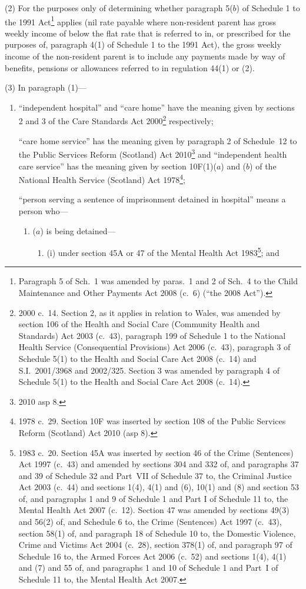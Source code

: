 \documentclass[12pt,a4paper]{article}
\begin{document}
(2) For the purposes only of determining whether paragraph 5($b$)  of Schedule 1 to the 1991 Act\footnote{Paragraph 5 of Sch.~1 was amended by paras.~1 and 2 of Sch.~4 to the Child Maintenance and Other Payments Act 2008 (c.~6) (“the 2008 Act”).} applies (nil rate payable where non-resident parent has gross weekly income of below the flat rate that is referred to in, or prescribed for the purposes of, paragraph 4(1) of Schedule 1 to the 1991 Act), the gross weekly income of the non-resident parent is to include any payments made by way of benefits, pensions or allowances referred to in regulation 44(1) or (2).

(3) In paragraph (1)—
\begin{enumerate}\item[]
“independent hospital” and “care home” have the meaning given by sections 2 and 3 of the Care Standards Act 2000\footnote{2000 c.~14. Section 2, as it applies in relation to Wales, was amended by section 106 of the Health and Social Care (Community Health and Standards) Act 2003 (c.~43), paragraph 199 of Schedule 1 to the National Health Service (Consequential Provisions) Act 2006 (c.~43), paragraph 3 of Schedule 5(1) to the Health and Social Care Act 2008 (c.~14) and S.I.~2001/3968 and 2002/325. Section 3 was amended by paragraph 4 of Schedule 5(1) to the Health and Social Care Act 2008 (c.~14).} respectively;

“care home service” has the meaning given by paragraph 2 of Schedule~12 to the Public Services Reform (Scotland) Act 2010\footnote{2010 asp 8.} and “independent health care service” has the meaning given by section 10F(1)($a$)  and ($b$)  of the National Health Service (Scotland) Act 1978\footnote{1978 c.~29. Section 10F was inserted by section 108 of the Public Services Reform (Scotland) Act 2010 (asp 8).};

“person serving a sentence of imprisonment detained in hospital” means a person who—
\begin{enumerate}\item[]
($a$) 
is being detained—
\begin{enumerate}\item[]
(i) 
under section 45A or 47 of the Mental Health Act 1983\footnote{1983 c.~20. Section 45A was inserted by section 46 of the Crime (Sentences) Act 1997 (c.~43) and amended by sections 304 and 332 of, and paragraphs 37 and 39 of Schedule 32 and Part~VII of Schedule 37 to, the Criminal Justice Act 2003 (c.~44) and sections 1(4), 4(1) and (6), 10(1) and (8) and section 53 of, and paragraphs 1 and 9 of Schedule 1 and Part I of Schedule 11 to, the Mental Health Act 2007 (c.~12). Section 47 was amended by sections 49(3) and 56(2) of, and Schedule 6 to, the Crime (Sentences) Act 1997 (c.~43), section 58(1) of, and paragraph 18 of Schedule 10 to, the Domestic Violence, Crime and Victims Act 2004 (c.~28), section 378(1) of, and paragraph 97 of Schedule 16 to, the Armed Forces Act 2006 (c.~52) and sections 1(4), 4(1) and (7) and 55 of, and paragraphs 1 and 10 of Schedule 1 and Part~I of Schedule 11 to, the Mental Health Act 2007.}; and


\end{enumerate}
\end{enumerate}
\end{enumerate}
\end{document}
